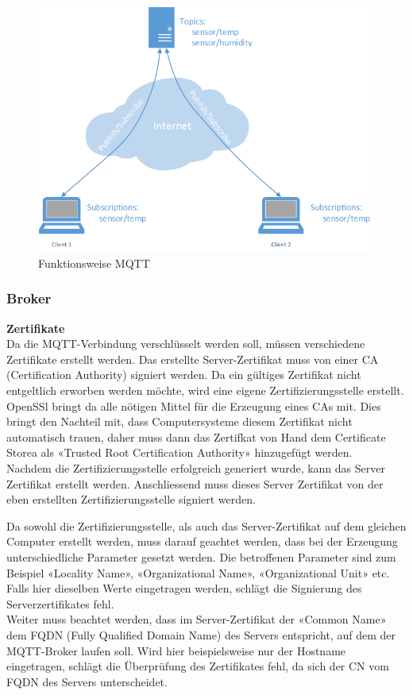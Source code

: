 \begin{figure}[h!]
	\centering
		\includegraphics[scale=0.6]{report/img/mqttFunktionsweise}
	\caption{Funktionsweise MQTT}
	\label{fig:deploymentAzure}
\end{figure}

\subsubsection{Broker}

\textbf{Zertifikate} \\
Da die MQTT-Verbindung verschlüsselt werden soll, müssen verschiedene Zertifikate erstellt werden. Das erstellte Server-Zertifikat muss von einer CA (Certification Authority) signiert werden. Da ein gültiges Zertifikat nicht entgeltlich erworben werden möchte, wird eine eigene Zertifizierungsstelle erstellt. OpenSSl bringt da alle nötigen Mittel für die Erzeugung eines CAs mit. Dies bringt den Nachteil mit, dass Computersysteme diesem Zertifikat nicht automatisch trauen, daher muss dann das Zertifkat von Hand dem Certificate Storea als «Trusted Root Certification Authority» hinzugefügt werden. \\

Nachdem die Zertifizierungsstelle erfolgreich generiert wurde, kann das Server Zertifikat erstellt werden. Anschliessend muss dieses Server Zertifikat von der eben erstellten Zertifizierungsstelle signiert werden.

Da sowohl die Zertifizierungsstelle, als auch das Server-Zertifikat auf dem gleichen Computer erstellt werden, muss darauf geachtet werden, dass bei der Erzeugung unterschiedliche Parameter gesetzt werden. Die betroffenen Parameter sind zum Beispiel «Locality Name», «Organizational Name», «Organizational Unit» etc. Falls hier dieselben Werte eingetragen werden, schlägt die Signierung des Serverzertifikates fehl. \\
Weiter muss beachtet werden, dass im Server-Zertifikat der «Common Name» dem FQDN (Fully Qualified Domain Name) des Servers entspricht, auf dem der MQTT-Broker laufen soll. Wird hier beispielsweise nur der Hostname eingetragen, schlägt die Überprüfung des Zertifikates fehl, da sich der CN vom FQDN des Servers unterscheidet.

